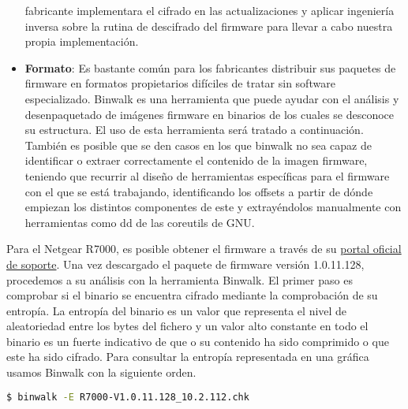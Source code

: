 \begin{itemize}
    fabricante implementara el cifrado en las actualizaciones y aplicar ingeniería inversa sobre la rutina de descifrado del firmware para llevar a cabo nuestra propia implementación. 
    \item \textbf{Formato}: Es bastante común para los fabricantes distribuir sus paquetes de firmware en formatos propietarios difíciles de tratar sin software especializado. 
    Binwalk\cite{binwalk} es una herramienta que puede ayudar con el análisis y desenpaquetado de imágenes firmware en binarios de los cuales se desconoce su estructura. El uso de esta herramienta
    será tratado a continuación. También es posible que se den casos en los que binwalk no sea capaz de identificar o extraer correctamente el contenido de la imagen firmware, 
    teniendo que recurrir al diseño de herramientas específicas para el firmware con el que se está trabajando, identificando los offsets a partir de dónde empiezan los distintos 
    componentes de este y extrayéndolos manualmente con herramientas como dd de las coreutils de GNU.
\end{itemize}

Para el Netgear R7000, es posible obtener el firmware a través de su \href{https://www.netgear.es/support/product/r7000.aspx#download}{portal oficial de soporte}. Una vez 
descargado el paquete de firmware versión 1.0.11.128, procedemos a su análisis con la herramienta Binwalk. El primer paso es comprobar si el binario se encuentra cifrado mediante 
la comprobación de su entropía. La entropía del binario es un valor que representa el nivel de aleatoriedad entre los bytes del fichero y un valor alto constante
en todo el binario es un fuerte indicativo de que o su contenido ha sido comprimido o que este ha sido cifrado. Para consultar la entropía representada en una gráfica usamos Binwalk con la siguiente orden. 
\begin{lstlisting}[language=bash]
  $ binwalk -E R7000-V1.0.11.128_10.2.112.chk
\end{lstlisting}

